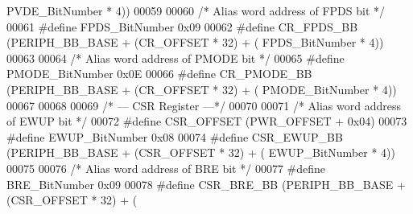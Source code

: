 \begin{DoxyCode}
      PVDE_BitNumber \textcolor{preprocessor}{*} 4\textcolor{preprocessor}{)}\textcolor{preprocessor}{)}
00059 
00060 \textcolor{comment}{/* Alias word address of FPDS bit */}
00061 \textcolor{preprocessor}{#}\textcolor{preprocessor}{define} \textcolor{preprocessor}{FPDS\_BitNumber}           0x09
00062 \textcolor{preprocessor}{#}\textcolor{preprocessor}{define} \textcolor{preprocessor}{CR\_FPDS\_BB}               \textcolor{preprocessor}{(}PERIPH_BB_BASE \textcolor{preprocessor}{+} \textcolor{preprocessor}{(}CR_OFFSET \textcolor{preprocessor}{*} 32\textcolor{preprocessor}{)} \textcolor{preprocessor}{+} \textcolor{preprocessor}{(}
      FPDS_BitNumber \textcolor{preprocessor}{*} 4\textcolor{preprocessor}{)}\textcolor{preprocessor}{)}
00063 
00064 \textcolor{comment}{/* Alias word address of PMODE bit */}
00065 \textcolor{preprocessor}{#}\textcolor{preprocessor}{define} \textcolor{preprocessor}{PMODE\_BitNumber}           0x0E
00066 \textcolor{preprocessor}{#}\textcolor{preprocessor}{define} \textcolor{preprocessor}{CR\_PMODE\_BB}               \textcolor{preprocessor}{(}PERIPH_BB_BASE \textcolor{preprocessor}{+} \textcolor{preprocessor}{(}CR_OFFSET \textcolor{preprocessor}{*} 32\textcolor{preprocessor}{)} \textcolor{preprocessor}{+} \textcolor{preprocessor}{(}
      PMODE_BitNumber \textcolor{preprocessor}{*} 4\textcolor{preprocessor}{)}\textcolor{preprocessor}{)}
00067 
00068 
00069 \textcolor{comment}{/* --- CSR Register ---*/}
00070 
00071 \textcolor{comment}{/* Alias word address of EWUP bit */}
00072 \textcolor{preprocessor}{#}\textcolor{preprocessor}{define} \textcolor{preprocessor}{CSR\_OFFSET}               \textcolor{preprocessor}{(}PWR_OFFSET \textcolor{preprocessor}{+} 0x04\textcolor{preprocessor}{)}
00073 \textcolor{preprocessor}{#}\textcolor{preprocessor}{define} \textcolor{preprocessor}{EWUP\_BitNumber}           0x08
00074 \textcolor{preprocessor}{#}\textcolor{preprocessor}{define} \textcolor{preprocessor}{CSR\_EWUP\_BB}              \textcolor{preprocessor}{(}PERIPH_BB_BASE \textcolor{preprocessor}{+} \textcolor{preprocessor}{(}CSR_OFFSET \textcolor{preprocessor}{*} 32\textcolor{preprocessor}{)} \textcolor{preprocessor}{+} \textcolor{preprocessor}{(}
      EWUP_BitNumber \textcolor{preprocessor}{*} 4\textcolor{preprocessor}{)}\textcolor{preprocessor}{)}
00075 
00076 \textcolor{comment}{/* Alias word address of BRE bit */}
00077 \textcolor{preprocessor}{#}\textcolor{preprocessor}{define} \textcolor{preprocessor}{BRE\_BitNumber}            0x09
00078 \textcolor{preprocessor}{#}\textcolor{preprocessor}{define} \textcolor{preprocessor}{CSR\_BRE\_BB}              \textcolor{preprocessor}{(}PERIPH_BB_BASE \textcolor{preprocessor}{+} \textcolor{preprocessor}{(}CSR_OFFSET \textcolor{preprocessor}{*} 32\textcolor{preprocessor}{)} \textcolor{preprocessor}{+} \textcolor{preprocessor}{(}

\end{DoxyCode}
